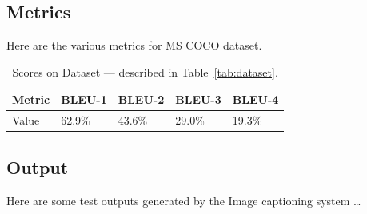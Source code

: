 \subsection{Metrics}
Here are the various metrics for MS COCO dataset. 
\begin{table}[h!]
\centering
\begin{tabular}{l|l|l|l|l}
Metric & BLEU-1 & BLEU-2 & BLEU-3 & BLEU-4  \\\hline
Value & 62.9\% & 43.6\% & 29.0\% & 19.3\% \\
\end{tabular}
\caption{\label{tab:metrics}Scores on Dataset --- described in Table~\ref{tab:dataset}.}
\end{table}

\subsection{Output}
Here are some test outputs generated by the Image captioning system \dots


